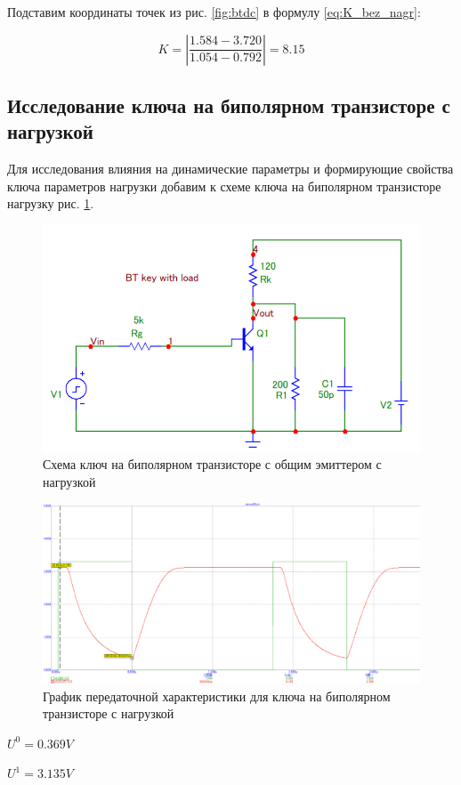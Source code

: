 \documentclass[a4paper,14pt]{article}
\begin{document}
Подставим координаты точек из рис. \ref{fig:btdc} в формулу \ref{eq:K_bez_nagr}:

\begin{equation}
K = \left|\dfrac{1.584 - 3.720}{1.054 - 0.792} \right| = 8.15
\label{eq:K_bez_nagr_p}
\end{equation}


\subsection{Исследование ключа на биполярном транзисторе с нагрузкой}

Для исследования влияния на динамические параметры и формирующие свойства ключа параметров нагрузки добавим к схеме ключа на биполярном транзисторе нагрузку рис. \ref{fig:btshnagr}.

\begin{figure}[H]
	\centering
	\includegraphics[width=0.7\linewidth]{image/BT_sh_nagr}
	\caption{Схема ключ на биполярном транзисторе с общим эмиттером с нагрузкой}
	\label{fig:btshnagr}
\end{figure}

\begin{figure}[H]
	\centering
	\includegraphics[width=0.7\linewidth]{image/BT_graf_nagr}
	\caption{График передаточной характеристики для ключа на биполярном транзисторе с нагрузкой}
	\label{fig:btgrafnagr}
\end{figure}

$U^0 = 0.369V$

$U^1 = 3.135V$
\end{document}
